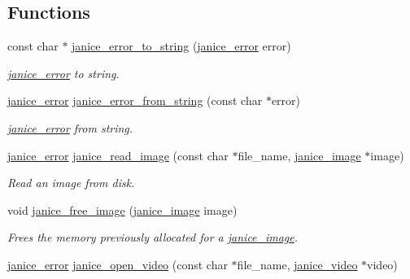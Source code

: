 \subsection*{Functions}
\begin{DoxyCompactItemize}
\item 
const char $\ast$ \hyperlink{group__janice__io_gaab03ac29fa90f0807739c6eecb82cf63}{janice\+\_\+error\+\_\+to\+\_\+string} (\hyperlink{group__janice_ga4873d49c1f9d6a6880dfbd485cf6ba72}{janice\+\_\+error} error)
\begin{DoxyCompactList}\small\item\em \hyperlink{group__janice_gac9071fe2c752efef60aa3f932a290fda}{janice\+\_\+error} to string. \end{DoxyCompactList}\item 
\hyperlink{group__janice_ga4873d49c1f9d6a6880dfbd485cf6ba72}{janice\+\_\+error} \hyperlink{group__janice__io_ga68c2c0091b2ca233b94197a50760c328}{janice\+\_\+error\+\_\+from\+\_\+string} (const char $\ast$error)
\begin{DoxyCompactList}\small\item\em \hyperlink{group__janice_gac9071fe2c752efef60aa3f932a290fda}{janice\+\_\+error} from string. \end{DoxyCompactList}\item 
\hyperlink{group__janice_ga4873d49c1f9d6a6880dfbd485cf6ba72}{janice\+\_\+error} \hyperlink{group__janice__io_gabaf8d4acd5f798a055b4c51bd4e3cfb6}{janice\+\_\+read\+\_\+image} (const char $\ast$file\+\_\+name, \hyperlink{structjanice__image}{janice\+\_\+image} $\ast$image)
\begin{DoxyCompactList}\small\item\em Read an image from disk. \end{DoxyCompactList}\item 
void \hyperlink{group__janice__io_gaf5c73401ec0b82d92c54794e9c809844}{janice\+\_\+free\+\_\+image} (\hyperlink{structjanice__image}{janice\+\_\+image} image)
\begin{DoxyCompactList}\small\item\em Frees the memory previously allocated for a \hyperlink{structjanice__image}{janice\+\_\+image}. \end{DoxyCompactList}\item 
\hyperlink{group__janice_ga4873d49c1f9d6a6880dfbd485cf6ba72}{janice\+\_\+error} \hyperlink{group__janice__io_ga279c7c207337e0cec2272090583668e0}{janice\+\_\+open\+\_\+video} (const char $\ast$file\+\_\+name, \hyperlink{group__janice__io_ga01c80201c1ce11f8c7a52cf9493b3ee2}{janice\+\_\+video} $\ast$video)

\end{DoxyCompactItemize}
